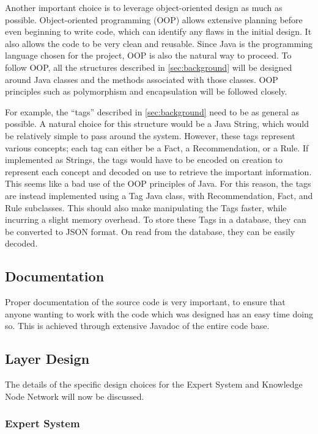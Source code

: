 \documentclass[titlepage,11pt]{article}
\begin{document}
Another important choice is to leverage object-oriented design as much as possible. Object-oriented programming (OOP) allows extensive planning before even beginning to write code, which can identify any flaws in the initial design. It also allows the code to be very clean and reusable. Since Java is the programming language chosen for the project, OOP is also the natural way to proceed. To follow OOP, all the structures described in \autoref{sec:background} will be designed around Java classes and the methods associated with those classes. OOP principles such as polymorphism and encapsulation will be followed closely.

For example, the ``tags'' described in \autoref{sec:background} need to be as general as possible. A natural choice for this structure would be a Java String, which would be relatively simple to pass around the system. However, these tags represent various concepts; each tag can either be a Fact, a Recommendation, or a Rule. If implemented as Strings, the tags would have to be encoded on creation to represent each concept and decoded on use to retrieve the important information. This seems like a bad use of the OOP principles of Java. For this reason, the tags are instead implemented using a Tag Java class, with Recommendation, Fact, and Rule subclasses. This should also make manipulating the Tags faster, while incurring a slight memory overhead. To store these Tags in a database, they can be converted to JSON format. On read from the database, they can be easily decoded.

\subsection{Documentation}

Proper documentation of the source code is very important, to ensure that anyone wanting to work with the code which was designed has an easy time doing so. This is achieved through extensive Javadoc of the entire code base.

\subsection{Layer Design}

The details of the specific design choices for the Expert System and Knowledge Node Network will now be discussed.

\subsubsection{Expert System}
\end{document}
